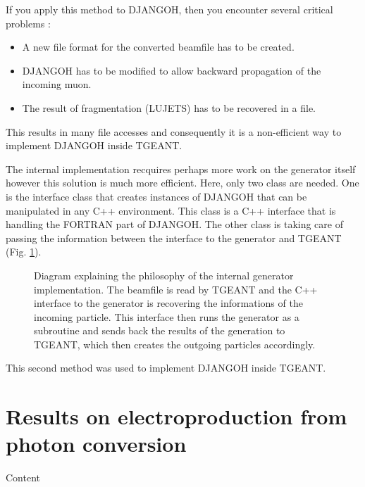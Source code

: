 \newpage
If you apply this method to DJANGOH, then you encounter several critical problems :
\begin{itemize}
\item A new file format for the converted beamfile has to be created.
\item DJANGOH has to be modified to allow backward propagation of the incoming muon.
\item The result of fragmentation (LUJETS) has to be recovered in a file.
\end{itemize}
This results in many file accesses and consequently it is a non-efficient way to
implement DJANGOH inside TGEANT.

The internal implementation recquires perhaps more work on the generator itself however
this solution is much more efficient. Here, only two class are needed. One is the
interface class that creates instances of DJANGOH that can be manipulated in any C++
environment. This class is a C++ interface that is handling the FORTRAN part of DJANGOH.
The other class is taking care of passing the information between the interface to the
generator and TGEANT (Fig. \ref{fig:pythiaex}).

\begin{figure}[!htb]
\centerline{}
\caption{Diagram explaining the philosophy of the internal generator implementation.
The beamfile is read by TGEANT and the C++ interface to the generator is recovering the
informations of the incoming particle. This interface then runs the generator as a subroutine
and sends back the results of the generation to TGEANT, which then creates the outgoing particles
accordingly.}\label{fig:pythiaex}
\end{figure}

This second method was used to implement DJANGOH inside TGEANT.


\section{Results on electroproduction from photon conversion}

Content
